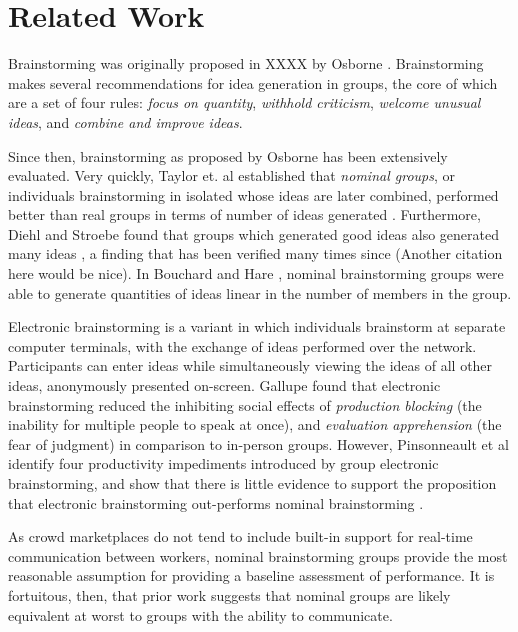 \section{Related Work}


Brainstorming was originally proposed in XXXX by Osborne \cite{osborn_applied_1957}. Brainstorming makes several recommendations for idea generation in groups, the core of which are a set of four rules: \emph{focus on quantity}, \emph{withhold criticism}, \emph{welcome unusual ideas}, and \emph{combine and improve ideas}.

Since then, brainstorming as proposed by Osborne has been extensively evaluated. Very quickly, Taylor et. al established that \emph{nominal groups}, or individuals brainstorming in isolated whose ideas are later combined, performed better than real groups in terms of number of ideas generated \cite{taylor_does_1958}. Furthermore, Diehl and Stroebe found that groups which generated good ideas also generated many ideas \cite{diehl_productivity_1987}, a finding that has been verified many times since (Another citation here would be nice). In Bouchard and Hare \cite{bouchard_jr_size_1970}, nominal brainstorming groups were able to generate quantities of ideas linear in the number of members in the group.

Electronic brainstorming is a variant in which individuals brainstorm at separate computer terminals, with the exchange of ideas performed over the network. Participants can enter ideas while simultaneously viewing the ideas of all other ideas, anonymously presented on-screen. Gallupe \cite{gallupe_electronic_1992} found that electronic brainstorming reduced the inhibiting social effects of \emph{production blocking} (the inability for multiple people to speak at once), and \emph{evaluation apprehension} (the fear of judgment) in comparison to in-person groups. However, Pinsonneault et al identify four productivity impediments introduced by group electronic brainstorming, and show that there is little evidence to support the proposition that electronic brainstorming out-performs nominal brainstorming \cite{pinsonneault_electronic_1999}.

As crowd marketplaces do not tend to include built-in support for real-time communication between workers, nominal brainstorming groups provide the most reasonable assumption for providing a baseline assessment of performance. It is fortuitous, then, that prior work suggests that nominal groups are likely equivalent at worst to groups with the ability to communicate.

